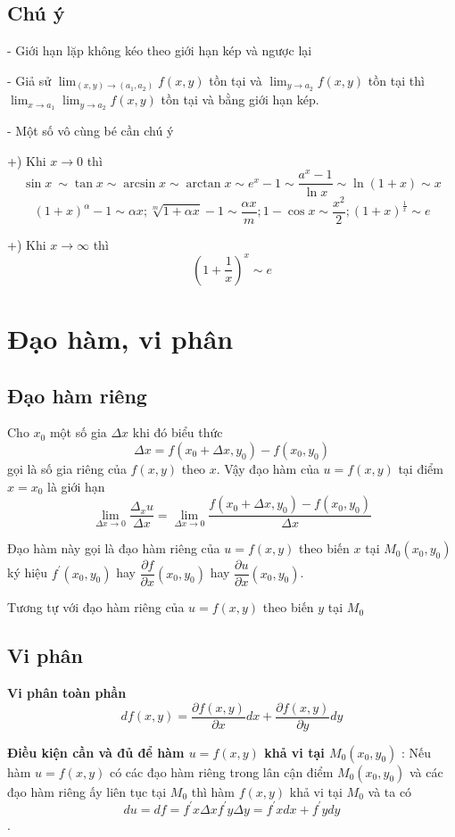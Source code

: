 \documentclass[12pt, a4paper]{article}
\begin{document}
	\subsection{Chú ý} 
	
	- Giới hạn lặp không kéo theo giới hạn kép và ngược lại
	
	- Giả sử $ \lim_{(x,y) \to (a_1, a_2)} f(x,y) $ tồn tại và $ \lim_{y \to a_2} f(x,y) $ tồn tại thì \\ $ \lim_{x \to a_1} \lim_{y \to a_2} f(x,y) $ tồn tại và bằng giới hạn kép.
	
	- Một số vô cùng bé cần chú ý

	+) Khi $ x \to 0 $ thì
	$$ \sin x \ \sim  \tan x \sim  \arcsin x \sim  \arctan x \sim  e^x-1 \sim  \frac{a^x-1}{\ln x} \sim \ln(1+x) \sim  x $$
	$$ (1+x)^\alpha - 1 \sim \alpha x ; \sqrt[m]{{1 + \alpha x}} - 1 \sim \frac{\alpha x}{m} ; 1 - \cos x \sim \frac{x^2}{2} ; (1 + x)^{\frac{1}{x}} \sim e $$
	
	+) Khi $ x \to \infty $ thì
	\[ (1+\frac{1}{x})^x \sim e \]
	
	\section{Đạo hàm, vi phân}
	\subsection{Đạo hàm riêng}
	Cho $ x_0 $ một số gia $ \Delta x $ khi đó biểu thức \[ \Delta x = f(x_0 + \Delta x, y_0)-f(x_0,y_0) \] gọi là số gia riêng của $ f(x,y) $ theo $ x $. Vậy đạo hàm của $ u=f(x,y) $ tại điểm $ x=x_0 $ là giới hạn \[ \lim_{\Delta x\to 0} \dfrac{\Delta_x u}{\Delta x} = \lim_{\Delta x\to 0} \dfrac{f(x_0 + \Delta x, y_0)-f(x_0,y_0)}{\Delta x}  \]
	
	Đạo hàm này gọi là đạo hàm riêng của $ u=f(x,y) $ theo biến $ x $ tại $ M_0(x_0,y_0) $ ký hiệu $ f^{'} (x_0,y_0) $ hay $ \dfrac {\partial f}{\partial x}(x_0,y_0)  $ hay $ \dfrac {\partial u}{\partial x}(x_0,y_0)  $.
	
	Tương tự với đạo hàm riêng của $ u=f(x,y) $ theo biến $ y $ tại $ M_0 $
	\subsection{Vi phân}
	\textbf {Vi phân toàn phần} \[ df(x,y)=\dfrac {\partial f(x,y)}{\partial x}dx + \dfrac {\partial f(x,y)}{\partial y}dy \]
	
	\textbf {Điều kiện cần và đủ để hàm $ u=f(x,y) $ khả vi tại $ M_0(x_0,y_0)$} 
	: Nếu hàm $ u=f(x,y) $ có các đạo hàm riêng trong lân cận điểm $ M_0(x_0,y_0) $ và các đạo hàm riêng ấy liên tục tại $ M_0 $ thì hàm $ f(x,y) $ khả vi tại $ M_0 $ và ta có \[ du=df=f^{'}x\Delta x f^{'}y\Delta y = f^{'}x dx + f^{'}y dy \].
	
\end{document}

